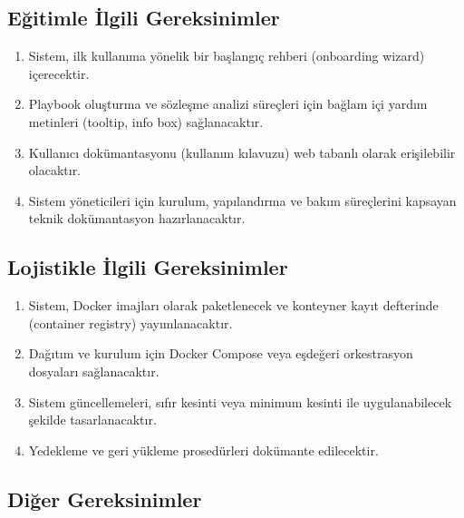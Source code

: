 \documentclass[12pt, a4paper]{article}
\begin{document}
\subsection{Eğitimle İlgili Gereksinimler}

\begin{enumerate}[leftmargin=2cm]
    \item Sistem, ilk kullanıma yönelik bir başlangıç rehberi (onboarding wizard) içerecektir.
    \item Playbook oluşturma ve sözleşme analizi süreçleri için bağlam içi yardım metinleri (tooltip, info box) sağlanacaktır.
    \item Kullanıcı dokümantasyonu (kullanım kılavuzu) web tabanlı olarak erişilebilir olacaktır.
    \item Sistem yöneticileri için kurulum, yapılandırma ve bakım süreçlerini kapsayan teknik dokümantasyon hazırlanacaktır.
\end{enumerate}

\subsection{Lojistikle İlgili Gereksinimler}

\begin{enumerate}[leftmargin=2cm]
    \item Sistem, Docker imajları olarak paketlenecek ve konteyner kayıt defterinde (container registry) yayımlanacaktır.
    \item Dağıtım ve kurulum için Docker Compose veya eşdeğeri orkestrasyon dosyaları sağlanacaktır.
    \item Sistem güncellemeleri, sıfır kesinti veya minimum kesinti ile uygulanabilecek şekilde tasarlanacaktır.
    \item Yedekleme ve geri yükleme prosedürleri dokümante edilecektir.
\end{enumerate}

\subsection{Diğer Gereksinimler}
\end{document}

